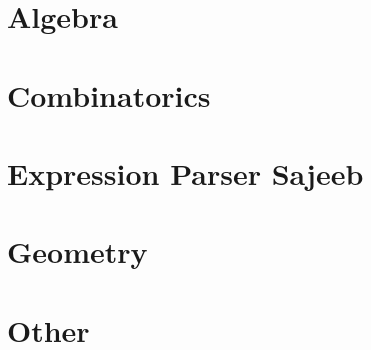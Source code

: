 


\section{Algebra}
\label{ns:algebra}





\bigskip




\clearpage

\section{Combinatorics}
\label{ns:combinatorics}





\bigskip




\clearpage

\section{Expression Parser Sajeeb}
\label{ns:expressionparsersajeeb}





\bigskip




\clearpage

\section{Geometry}
\label{ns:geometry}





\bigskip




\clearpage


\section{Other}
\label{ns:other}





\bigskip




\clearpage

